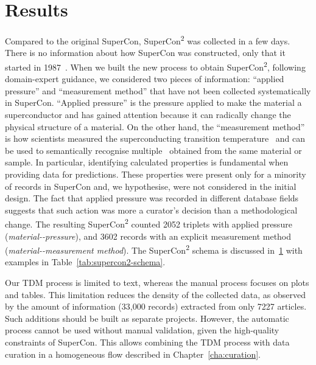 \section{Results}
\label{sec:results-supercon2}

Compared to the original SuperCon, SuperCon\textsuperscript{2} was collected in a few days. There is no information about how SuperCon was constructed, only that it started in 1987~\cite{ishii2023structuring}. 
When we built the new process to obtain SuperCon\textsuperscript{2}, following domain-expert guidance, we considered two pieces of information: ``applied pressure'' and ``measurement method'' that have not been collected systematically in SuperCon.
``Applied pressure'' is the pressure applied to make the material a superconductor and has gained attention because it can radically change the physical structure of a material. 
On the other hand, the ``measurement method'' is how scientists measured the superconducting transition temperature \tc~and can be used to semantically recognise multiple \tc~obtained from the same material or sample. 
In particular, identifying calculated properties is fundamental when providing data for predictions. 
These properties were present only for a minority of records in SuperCon and, we hypothesise, were not considered in the initial design. The fact that applied pressure was recorded in different database fields suggests that such action was more a curator's decision than a methodological change.
The resulting SuperCon\textsuperscript{2} counted 2052 triplets with applied pressure (\textit{material-\tc-pressure}), and 3602 records with an explicit measurement method (\textit{material-\tc-measurement method}).
The SuperCon\textsuperscript{2} schema is discussed in~\ref{sec:results-supercon2} with examples in Table~\ref{tab:supercon2-schema}. 

Our TDM process is limited to text, whereas the manual process focuses on plots and tables. This limitation reduces the density of the collected data, as observed by the amount of information (33,000 records) extracted from only 7227 articles. Such additions should be built as separate projects.
However, the automatic process cannot be used without manual validation, given the high-quality constraints of SuperCon. This allows combining the TDM process with data curation in a homogeneous flow described in Chapter~\ref{cha:curation}.

